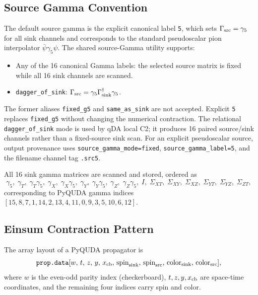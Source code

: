 \documentclass[11pt,a4paper]{article}
\begin{document}
\subsection{Source Gamma Convention}

The default source gamma is the explicit canonical label \texttt{5}, which
sets $\Gamma_{\rm src}=\gamma_5$ for all sink channels and corresponds to
the standard pseudoscalar pion interpolator
$\bar\psi \gamma_5 \psi$.  The shared source-Gamma utility supports:
\begin{itemize}[nosep]
  \item Any of the 16 canonical Gamma labels: the selected source matrix is
        fixed while all 16 sink channels are scanned.
  \item \texttt{dagger\_of\_sink}: $\Gamma_{\rm src}
        = \gamma_5 \Gamma_{\rm sink}^\dagger \gamma_5$.
\end{itemize}
The former aliases \texttt{fixed\_g5} and \texttt{same\_as\_sink} are not
accepted.  Explicit \texttt{5} replaces \texttt{fixed\_g5} without changing
the numerical contraction.  The relational \texttt{dagger\_of\_sink} mode
is used by qDA local C2; it produces 16 paired source/sink channels rather than
a fixed-source sink scan.
For an explicit pseudoscalar source, output provenance uses
\texttt{source\_gamma\_mode=fixed},
\texttt{source\_gamma\_label=5}, and the filename channel tag
\texttt{.src5}.

All 16 sink gamma matrices are scanned and stored, ordered as
\begin{equation}
  \label{eq:gamma_order}
  \gamma_5,\;
  \gamma_T,\;
  \gamma_T\gamma_5,\;
  \gamma_X,\;
  \gamma_X\gamma_5,\;
  \gamma_Y,\;
  \gamma_Y\gamma_5,\;
  \gamma_Z,\;
  \gamma_Z\gamma_5,\;
  I,\;
  \Sigma_{XT},\;
  \Sigma_{XY},\;
  \Sigma_{XZ},\;
  \Sigma_{YT},\;
  \Sigma_{YZ},\;
  \Sigma_{ZT},
\end{equation}
corresponding to PyQUDA gamma indices
$[15, 8, 7, 1, 14, 2, 13, 4, 11, 0, 9, 3, 5, 10, 6, 12]$.

\subsection{Einsum Contraction Pattern}

The array layout of a PyQUDA propagator is
\begin{equation}
  \texttt{prop.data}[w,\, t,\, z,\, y,\, x_{\rm cb},\,
                      \text{spin}_{\rm sink},\,
                      \text{spin}_{\rm src},\,
                      \text{color}_{\rm sink},\,
                      \text{color}_{\rm src}],
\end{equation}
where $w$ is the even-odd parity index (checkerboard), $t,z,y,x_{\rm cb}$
are space-time coordinates, and the remaining four indices carry spin and color.
\end{document}
